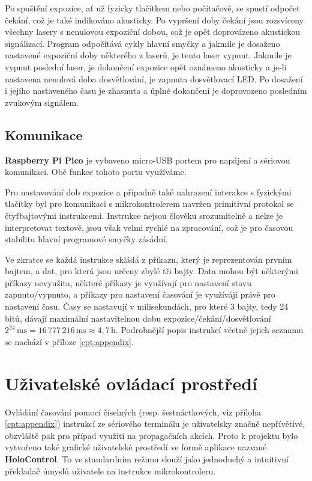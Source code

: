 \documentclass[twoside,project]{../MFFPrace}
\begin{document}
Po spuštění expozice, ať už fyzicky tlačítkem nebo počítačově, se spustí odpočet čekání, což je také indikováno akusticky. Po vypršení doby čekání jsou rozsvíceny všechny lasery s nenulovou expoziční dobou, což je opět doprovázeno akustickou signálizací. Program odpočítává cykly hlavní smyčky a jakmile je dosaženo nastavené expoziční doby některého z laserů, je tento laser vypnut. Jakmile je vypnut poslední laser, je dokončení expozice opět oznámeno akusticky a je-li nastavena nenulová doba dosvětlování, je zapnuta dosvětlovací LED. Po dosažení i jejího nastaveného času je zhasnuta a úplné dokončení je doprovozeno posledním zvukovým signálem.

\subsection{Komunikace}
\textbf{Raspberry Pi Pico} je vybaveno micro-USB portem pro napájení a sériovou komunikaci. Obě funkce tohoto portu využíváme.

Pro nastavování dob expozice a případně také nahrazení interakce s fyzickými tlačítky byl pro komunikaci s mikrokontrolerem navržen primitivní protokol se čtyřbajtovými instrukcemi. Instrukce nejsou člověku srozumitelné a nelze je interpretovat textově, jsou však velmi rychlé na zpracování, což je pro časovou stabilitu hlavní programové smyčky zásádní.

\medskip

Ve zkratce se každá instrukce skládá z příkazu, který je reprezentován prvním bajtem, a dat, pro která jsou určeny zbylé tři bajty. Data mohou být některými příkazy nevyužita, některé příkazy je využívají pro nastavení stavu zapnuto/vypnuto, a příkazy pro nastavení časování je využívájí právě pro nastavení času. Časy se nastavují v milisekundách, pro které 3 bajty, tedy 24 bitů, dávají maximální nastavitelnou dobu expozice/čekání/dosvětlování $2^{24}\,\text{ms}=16\,777\,216\,\text{ms}\approx4{,}7\,\text{h}$. Podrobnější popis instrukcí včetně jejich seznamu se nachází v příloze \ref{cpt:appendix}.

\section{Uživatelské ovládací prostředí}
Ovládání časování pomocí číselných (resp. šestnáctkových, viz příloha \ref{cpt:appendix}) instrukcí ze sériového terminálu je uživatelsky značně nepřívětivé, obzvláště pak pro případ využití na propagačních akcích. Proto k projektu bylo vytvořeno také grafické uživatelské prostředí ve formě aplikace nazvané \textbf{HoloControl}. To ve standardním režimu slouží jako jednoduchý a intuitivní překladač úmyslů uživatele na instrukce mikrokontroleru.
\end{document}
